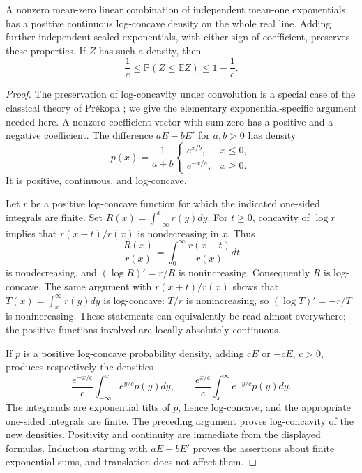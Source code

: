 \begin{lemma}
\label{prob:logconcavity}
A nonzero mean-zero linear combination of independent mean-one
exponentials has a positive continuous log-concave density on the whole
real line. Adding further independent scaled exponentials, with either
sign of coefficient, preserves these properties. If $Z$ has such a
density, then
\begin{equation}\label{prob:grunbaum}
 \frac1e\le\mathbb P(Z\le\mathbb EZ)\le1-\frac1e.
\end{equation}
\end{lemma}

\begin{proof}
The preservation of log-concavity under convolution is a special case
of the classical theory of Pr\'ekopa
\cite[Theorems~7--8]{Prekopa1973}; we give the elementary
exponential-specific argument needed here. A nonzero coefficient
vector with sum zero has a positive and a negative coefficient. The
difference $aE-bE'$ for $a,b>0$ has density
\[
 p(x)=\frac1{a+b}
 \begin{cases}e^{x/b},&x\le0,\\e^{-x/a},&x\ge0.
 \end{cases}
\]
It is positive, continuous, and log-concave.

Let $r$ be a positive log-concave function for which the indicated
one-sided integrals are finite. Set
$R(x)=\int_{-\infty}^x r(y)dy$. For $t\ge0$, concavity of $\log r$
implies that $r(x-t)/r(x)$ is nondecreasing in $x$. Thus
\[
 \frac{R(x)}{r(x)}=\int_0^\infty\frac{r(x-t)}{r(x)}dt
\]
is nondecreasing, and $(\log R)'=r/R$ is nonincreasing. Consequently
$R$ is log-concave. The same argument with $r(x+t)/r(x)$ shows that
$T(x)=\int_x^\infty r(y)dy$ is log-concave: $T/r$ is nonincreasing,
so $(\log T)'=-r/T$ is nonincreasing. These statements can equivalently
be read almost everywhere; the positive functions involved are locally
absolutely continuous.

If $p$ is a positive log-concave probability density, adding $cE$ or
$-cE$, $c>0$, produces respectively the densities
\[
 \frac{e^{-x/c}}c\int_{-\infty}^x e^{y/c}p(y)dy,
 \qquad
 \frac{e^{x/c}}c\int_x^\infty e^{-y/c}p(y)dy.
\]
The integrands are exponential tilts of $p$, hence log-concave, and
the appropriate one-sided integrals are finite. The preceding argument
proves log-concavity of the new densities. Positivity and continuity
are immediate from the displayed formulas. Induction starting with
$aE-bE'$ proves the assertions about finite exponential sums, and
translation does not affect them.


\end{proof}

